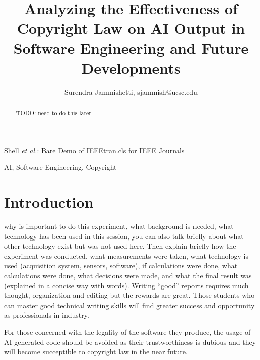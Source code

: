 \documentclass[journal]{IEEEtran}
\begin{document}
\title{Analyzing the Effectiveness of Copyright Law on AI Output in Software
Engineering and Future Developments}

\author{Surendra Jammishetti, sjammish@ucsc.edu}%
        
{Shell \MakeLowercase{\textit{et al.}}: Bare Demo of IEEEtran.cls for IEEE Journals}

\maketitle

\begin{abstract}
TODO: need to do this later
\end{abstract}

\begin{IEEEkeywords}
AI, Software Engineering, Copyright
\end{IEEEkeywords}

\section{Introduction}
%
% 

 why is important to do this experiment, what background is needed, what technology has been used in this session, you can also talk briefly about what other technology exist but was not used here.
Then explain briefly how the experiment was conducted, what measurements were taken, what technology is used (acquisition system, sensors, software), if calculations were done, what calculations were done, what decisions were made, and what the final result was (explained in a concise way with words).
Writing “good” reports requires much thought, organization and editing but the rewards are
great. Those students who can master good technical writing skills will find greater success and
opportunity as professionals in industry.

For those concerned with the legality of the software they produce, the usage of
AI-generated code should be avoided as their trustworthiness is dubious and
they will become succeptible to copyright law in the near future.
\end{document}
